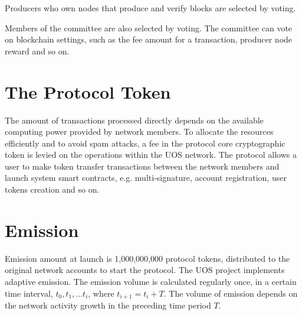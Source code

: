 \documentclass[a4paper,12pt]{article}
\begin{document}
Producers who own nodes that produce and verify blocks are selected by voting.

Members of the committee are also selected by voting. The committee can vote on blockchain settings, such as the fee amount for a transaction, producer node reward and so on. 

% 
% 
% 
% 


\section{The Protocol Token}

The amount of transactions processed directly depends on the available computing power provided by network members. To allocate the resources efficiently and to avoid spam attacks, a fee in the protocol core cryptographic token is levied on the operations within the UOS network. The protocol allows a user to make token transfer transactions between the network members and launch system smart contracts, e.g. multi-signature, account registration, user tokens creation and so on.


\section{Emission}

Emission amount at launch is 1,000,000,000 protocol tokens, distributed to the original network accounts to start the protocol. The UOS project implements adaptive emission. The emission volume is calculated regularly once, in a certain time interval, $t_0, t_1, ... t_i$, where $t_{i+1} = t_i + T$. The volume of emission depends on the network activity growth in the preceding time period $T$.
\end{document}
